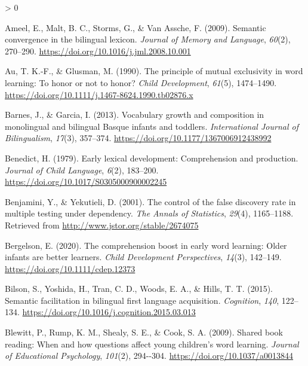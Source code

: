 \documentclass[
  english,
  ,man,floatsintext]{apa6}
\newlength{\cslhangindent}
\newenvironment{CSLReferences}[2] %
 {%
  \setlength{\parindent}{0pt}
  \ifodd #1 \everypar{\setlength{\hangindent}{\cslhangindent}}\ignorespaces\fi
  \ifnum #2 > 0
  \setlength{\parskip}{#2\baselineskip}
  \fi
 }%
 {}
\begin{document}
\hypertarget{refs}{}
\begin{CSLReferences}{1}{0}
\leavevmode\hypertarget{ref-Ameel_etal_2009}{}%
Ameel, E., Malt, B. C., Storms, G., \& Van Assche, F. (2009). Semantic convergence in the bilingual lexicon. \emph{Journal of Memory and Language}, \emph{60}(2), 270--290. \url{https://doi.org/10.1016/j.jml.2008.10.001}

\leavevmode\hypertarget{ref-Au_Glusman_1990}{}%
Au, T. K.-F., \& Glusman, M. (1990). The principle of mutual exclusivity in word learning: To honor or not to honor? \emph{Child Development}, \emph{61}(5), 1474--1490. \url{https://doi.org/10.1111/j.1467-8624.1990.tb02876.x}

\leavevmode\hypertarget{ref-Barnes_Garcia_2013}{}%
Barnes, J., \& Garcia, I. (2013). Vocabulary growth and composition in monolingual and bilingual {B}asque infants and toddlers. \emph{International Journal of Bilingualism}, \emph{17}(3), 357--374. \url{https://doi.org/10.1177/1367006912438992}

\leavevmode\hypertarget{ref-Benedict_1979}{}%
Benedict, H. (1979). Early lexical development: Comprehension and production. \emph{Journal of Child Language}, \emph{6}(2), 183--200. \url{https://doi.org/10.1017/S0305000900002245}

\leavevmode\hypertarget{ref-Benjamini_Yekutieli_2001}{}%
Benjamini, Y., \& Yekutieli, D. (2001). The control of the false discovery rate in multiple testing under dependency. \emph{The Annals of Statistics}, \emph{29}(4), 1165--1188. Retrieved from \url{http://www.jstor.org/stable/2674075}

\leavevmode\hypertarget{ref-Bergelson_2020}{}%
Bergelson, E. (2020). The comprehension boost in early word learning: Older infants are better learners. \emph{Child Development Perspectives}, \emph{14}(3), 142--149. \url{https://doi.org/10.1111/cdep.12373}

\leavevmode\hypertarget{ref-Bilson_etal_2015}{}%
Bilson, S., Yoshida, H., Tran, C. D., Woods, E. A., \& Hills, T. T. (2015). Semantic facilitation in bilingual first language acquisition. \emph{Cognition}, \emph{140}, 122--134. \url{https://doi.org/10.1016/j.cognition.2015.03.013}

\leavevmode\hypertarget{ref-Blewitt_etal_2009}{}%
Blewitt, P., Rump, K. M., Shealy, S. E., \& Cook, S. A. (2009). Shared book reading: When and how questions affect young children's word learning. \emph{Journal of Educational Psychology}, \emph{101}(2), 294-\/-304. \url{https://doi.org/10.1037/a0013844}


\end{CSLReferences}
\end{document}
